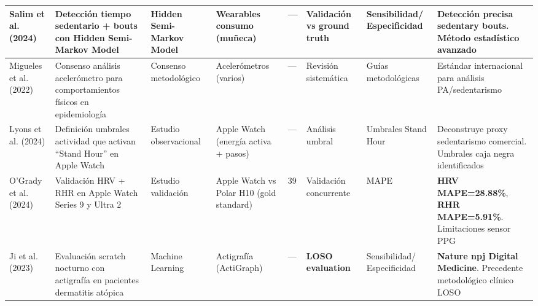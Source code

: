 \begin{table}[htbp]
\begin{tabular}{@{}p{1.8cm}p{2.2cm}p{1.5cm}p{1.3cm}p{0.8cm}p{1.2cm}p{1.8cm}p{1.5cm}@{}}
        \midrule
        
        
        Salim et al. (2024) \cite{Salim2024STEPHEN} & 
        Detección tiempo sedentario + bouts con Hidden Semi-Markov Model & 
        Hidden Semi-Markov Model & 
        Wearables consumo (muñeca) & 
        --- & 
        Validación vs ground truth & 
        Sensibilidad/ Especificidad & 
        Detección precisa sedentary bouts. Método estadístico avanzado \\
        
        \midrule
        
        Migueles et al. (2022) \cite{Migueles2022GRANADA} & 
        Consenso análisis acelerómetro para comportamientos físicos en epidemiología & 
        Consenso metodológico & 
        Acelerómetros (varios) & 
        --- & 
        Revisión sistemática & 
        Guías metodológicas & 
        Estándar internacional para análisis PA/sedentarismo \\
        
        \midrule
        
        
        Lyons et al. (2024) \cite{Lyons2024StandHour} & 
        Definición umbrales actividad que activan ``Stand Hour'' en Apple Watch & 
        Estudio observacional & 
        Apple Watch (energía activa + pasos) & 
        --- & 
        Análisis umbral & 
        Umbrales Stand Hour & 
        Deconstruye proxy sedentarismo comercial. Umbrales caja negra identificados \\
        
        \midrule
        
        O'Grady et al. (2024) \cite{OGrady2024AppleWatch} & 
        Validación HRV + RHR en Apple Watch Series 9 y Ultra 2 & 
        Estudio validación & 
        Apple Watch vs Polar H10 (gold standard) & 
        39 & 
        Validación concurrente & 
        MAPE & 
        \textbf{HRV MAPE=28.88\%}, \textbf{RHR MAPE=5.91\%}. Limitaciones sensor PPG \\
        
        \midrule
        
        Ji et al. (2023) \cite{Ji2023Scratch} & 
        Evaluación scratch nocturno con actigrafía en pacientes dermatitis atópica & 
        Machine Learning & 
        Actigrafía (ActiGraph) & 
        --- & 
        \textbf{LOSO evaluation} & 
        Sensibilidad/ Especificidad & 
        \textbf{Nature npj Digital Medicine}. Precedente metodológico clínico LOSO \\
        

\end{tabular}
\end{table}
